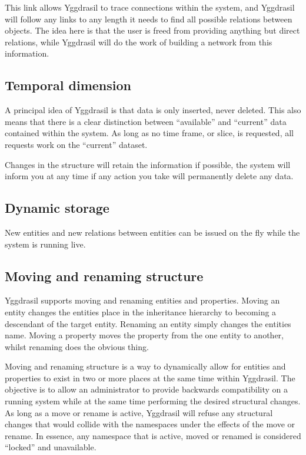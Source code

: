\documentclass[english,a4paper]{article}
\begin{document}
This link allows Yggdrasil to trace connections within the system, and
Yggdrasil will follow any links to any length it needs to find all
possible relations between objects.  The idea here is that the user is
freed from providing anything but direct relations, while Yggdrasil
will do the work of building a network from this information.

\subsection{Temporal dimension}

A principal idea of Yggdrasil is that data is only inserted, never
deleted.  This also means that there is a clear distinction between
``available'' and ``current'' data contained within the system.
As long as no time frame, or slice, is requested, all requests work on
the ``current'' dataset. 


Changes in the structure will retain the information if possible, the
system will inform you at any time if any action you take will
permanently delete any data.

\subsection{Dynamic storage}

New entities and new relations between entities can be issued on the
fly while the system is running live.  

\subsection{Moving and renaming structure}

Yggdrasil supports moving and renaming entities and properties.
Moving an entity changes the entities place in the inheritance
hierarchy to becoming a descendant of the target entity.  Renaming an
entity simply changes the entities name.  Moving a property moves the
property from the one entity to another, whilst renaming does the
obvious thing.

Moving and renaming structure is a way to dynamically allow for
entities and properties to exist in two or more places at the same
time within Yggdrasil.  The objective is to allow an administrator to
provide backwards compatibility on a running system while at the same
time performing the desired structural changes.  As long as a move or
rename is active, Yggdrasil will refuse any structural changes that
would collide with the namespaces under the effects of the move or
rename.  In essence, any namespace that is active, moved or renamed is
considered ``locked'' and unavailable.
\end{document}
